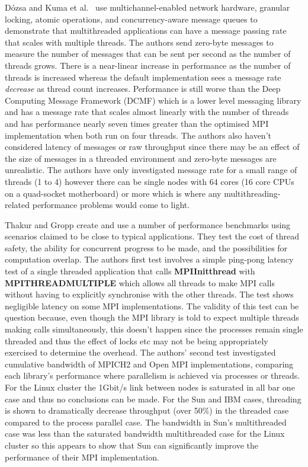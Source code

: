 \documentclass{acm_proc_article-sp}
\renewcommand{\_}{\underscore\hspace{0pt}}
\begin{document}
D\'{o}zsa and Kuma et al.\ \cite{Kumar} use multichannel-enabled network
hardware, granular locking, atomic operations, and concurrency-aware message
queues to demonstrate that multithreaded applications can have a message passing
rate that scales with multiple threads. The authors send zero-byte messages to
measure the number of messages that can be sent per second as the number of
threads grows. There is a near-linear increase in performance as the number of
threads is increased whereas the default implementation sees a message rate
\textit{decrease} as thread count increases. Performance is still worse than the
Deep Computing Message Framework (DCMF) which is a lower level messaging library
and has a message rate that scales almost linearly with the number of threads
and has performance nearly seven times greater than the optimised MPI
implementation when both run on four threads. The authors also haven't
considered latency of messages or raw throughput since there may be an effect of
the size of messages in a threaded environment and zero-byte messages are
unrealistic. The authors have only investigated message rate for a small range
of threads (1 to 4) however there can be single nodes with 64 cores (16 core
CPUs on a quad-socket motherboard) or more which is where any
multithreading-related performance problems would come to light.

Thakur and Gropp \cite{Thakur2009} create and use a number of performance
benchmarks using scenarios claimed to be close to typical applications. They
test the cost of thread safety, the ability for concurrent progress to be made,
and the possibilities for computation overlap. The authors first test involves a
simple ping-pong latency test of a single threaded application that calls
\textbf{MPI\_Init\_thread} with \textbf{MPI\_THREAD\_MULTIPLE} which allows all
threads to make MPI calls without having to explicitly synchronise with the
other threads. The test shows negligible latency on some MPI implementations.
The validity of this test can be question because, even though the MPI library
is told to expect multiple threads making calls simultaneously, this doesn't
happen since the processes remain single threaded and thus the effect of locks
etc may not be being appropriately exercised to determine the overhead. The
authors' second test investigated cumulative bandwidth of MPICH2 and Open MPI
implementations, comparing each library's performance where parallelism is
achieved via processes or threads. For the Linux cluster the 1Gbit/s link
between nodes is saturated in all bar one case and thus no conclusions can be
made. For the Sun and IBM cases, threading is shown to dramatically decrease
throughput (over 50\%) in the threaded case compared to the process parallel
case. The bandwidth in Sun's multithreaded case was less than the saturated
bandwidth multithreaded case for the Linux cluster so this appears to show that
Sun can significantly improve the performance of their MPI implementation.
\end{document}
